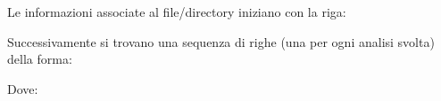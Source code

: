 \documentclass[letterpaper,10pt,italian,openany,oneside]{sphinxmanual}
\begin{document}
\begin{sphinxVerbatim}[commandchars=\\\{\}]
        
\end{sphinxVerbatim}

Le informazioni associate al file/directory  iniziano con la riga:

\begin{sphinxVerbatim}[commandchars=\\\{\}]
\end{sphinxVerbatim}

Successivamente si trovano una sequenza di righe (una per ogni analisi svolta) della forma:

\begin{sphinxVerbatim}[commandchars=\\\{\}]
        
\end{sphinxVerbatim}

Dove:
\end{document}
